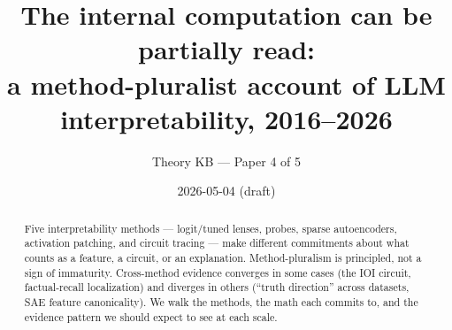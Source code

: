 








\title{
  The internal computation can be partially read: \\
  a method-pluralist account of LLM interpretability, 2016--2026
}
\author{Theory KB --- Paper 4 of 5}
\date{2026-05-04 (draft)}


\maketitle

\begin{abstract}
Five interpretability methods --- logit/tuned lenses, probes, sparse
autoencoders, activation patching, and circuit tracing --- make
different commitments about what counts as a feature, a circuit, or
an explanation. Method-pluralism is principled, not a sign of
immaturity. Cross-method evidence converges in some cases (the IOI
circuit, factual-recall localization) and diverges in others
(``truth direction'' across datasets, SAE feature canonicality). We
walk the methods, the math each commits to, and the evidence pattern
we should expect to see at each scale.
\end{abstract}

\tableofcontents




















